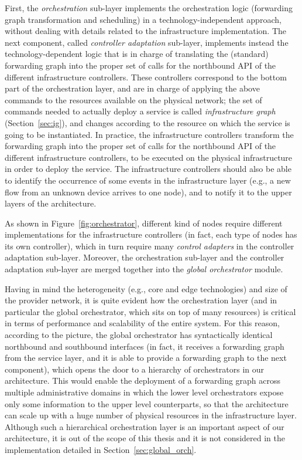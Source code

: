 First, the \textit{orchestration} sub-layer implements the orchestration logic (forwarding graph transformation and scheduling) in a technology-independent approach, without dealing with details related to the infrastructure implementation. 
The next component, called \textit{controller adaptation} sub-layer, implements instead the technology-dependent logic that is in charge of translating the (standard) forwarding graph into the proper set of calls for the northbound API of the different infrastructure controllers.
These controllers correspond to the bottom part of the orchestration layer, and are in charge of applying the above commands to the resources available on the physical network; the set of commands needed to actually deploy a service is called \textit{infrastructure graph} (Section~\ref{sec:ig}), and changes according to the resource on which the service is going to be instantiated.
In practice, the infrastructure controllers transform the forwarding graph into the proper set of calls for the northbound API of the different infrastructure controllers, to be executed on the physical infrastructure in order to deploy the service.
The infrastructure controllers should also be able to identify the occurrence of some events in the infrastructure layer (e.g., a new flow from an unknown device arrives to one node), and to notify it to the upper layers of the architecture.

As shown in Figure~\ref{fig:orchestrator}, different kind of nodes require different implementations for the infrastructure controllers (in fact, each type of nodes has its own controller), which in turn require many \textit{control adapters} in the controller adaptation sub-layer.
Moreover, the orchestration sub-layer and the controller adaptation sub-layer are merged together into the \textit{global orchestrator} module.

Having in mind the heterogeneity (e.g., core and edge technologies) and size of the provider network, it is quite evident how the orchestration layer (and in particular the global orchestrator, which sits on top of many resources) is critical in terms of performance and scalability %
of the entire system. 
For this reason, according to the picture, the global orchestrator has syntactically identical northbound and southbound interfaces (in fact, it receives a forwarding graph from the service layer, and it is able to provide a forwarding graph to the next component), which opens the door to a hierarchy of orchestrators %
in our architecture.
This would enable the deployment of a forwarding graph across multiple administrative domains in which the lower level orchestrators expose only some information to the upper level counterparts, so that %
the architecture can scale up with a huge number of physical resources in the infrastructure layer.
Although such a hierarchical orchestration layer is an important aspect of our architecture, it is out of the scope of this thesis and it is not considered in the implementation detailed in Section~\ref{sec:global_orch}.

